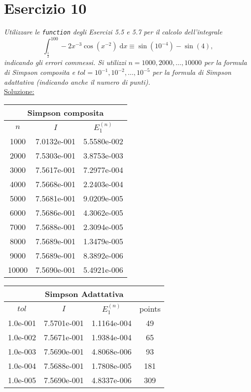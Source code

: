 \section{Esercizio 10}
\label{sub:es10}
\emph{Utilizzare le \lstinline{function} degli Esercizi 5.5 e 5.7 per il calcolo dell'integrale
      $$\int_{\frac{1}{2}}^{100}-2x^{-3}\cos\left(x^{-2}\right)\;\mathrm{d}x\equiv\sin\left(10^{-4}\right)-\sin(4),$$
			indicando gli errori commessi.
      Si utilizzi $n=1000,2000,\dots,10000$ per la formula di Simpson composita e
      $tol=10^{-1},10^{-2},\dots,10^{-5}$ per la formula di Simpson adattativa (indicando anche il numero di punti).}\\
			\underline{Soluzione:}\\
			\begin{center}\begin{tabular}{c|c|c}
			\hline\multicolumn{3}{c}{Simpson composita}\\\hline
			$n$ & $I$ & $E_1^{(n)}$\\\hline
			 1000 	  &7.0132e-001 	  &5.5580e-002\\
			 2000 	  &7.5303e-001 	  &3.8753e-003\\
			 3000 	  &7.5617e-001 	  &7.2977e-004\\
			 4000 	  &7.5668e-001 	  &2.2403e-004\\
			 5000 	  &7.5681e-001 	  &9.0209e-005\\
			 6000 	  &7.5686e-001 	  &4.3062e-005\\
			 7000 	  &7.5688e-001 	  &2.3094e-005\\
			 8000 	  &7.5689e-001 	  &1.3479e-005\\
			 9000 	  &7.5689e-001 	  &8.3892e-006\\
			 10000 	  &7.5690e-001 	  &5.4921e-006
			\end{tabular}\end{center}\begin{center}
			\begin{tabular}{c|c|c|c}
			\hline\multicolumn{4}{c}{Simpson Adattativa}\\\hline
			$tol$ & $I$ & $E_1^{(n)}$ & points\\\hline
			 1.0e-001 	  &7.5701e-001 	  &1.1164e-004 	  &49\\
			 1.0e-002 	  &7.5671e-001 	  &1.9384e-004 	  &65\\
			 1.0e-003 	  &7.5690e-001 	  &4.8068e-006 	  &93\\
			 1.0e-004 	  &7.5688e-001 	  &1.7808e-005 	  &181\\
			 1.0e-005 	  &7.5690e-001 	  &4.8337e-006 	  &309
			\end{tabular}\end{center}
